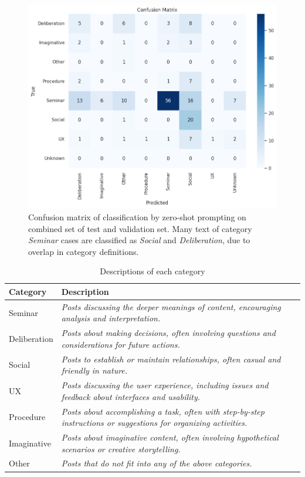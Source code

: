 \documentclass[fleqn,moreauthors,10pt]{ds_report}
\begin{document}
\begin{figure}[ht!]\centering
	\includegraphics[scale=0.4]{fig/zero-shot-combined_cm_2.png}
	\caption{Confusion matrix of classification by zero-shot prompting on combined set of test and validation set.
Many text of category \textit{Seminar} cases are classified as \textit{Social} and \textit{Deliberation}, due to overlap in category definitions.}
	\label{fig:zero_shot_combined_cm}
\end{figure}


\begin{table}[h!]
\caption{Descriptions of each category}
\begin{adjustbox}{width=\columnwidth,center}
\begin{tabular}{l|p{8cm}}
Category & Description\\
\hline
Seminar & \textit{Posts discussing the deeper meanings of content, encouraging analysis and interpretation.} \\
Deliberation & \textit{Posts about making decisions, often involving questions and considerations for future actions.}\\
Social & \textit{Posts to establish or maintain relationships, often casual and friendly in nature.} \\
UX & \textit{Posts discussing the user experience, including issues and feedback about interfaces and usability.} \\
Procedure & \textit{Posts about accomplishing a task, often with step-by-step instructions or suggestions for organizing activities.} \\
Imaginative & \textit{Posts about imaginative content, often involving hypothetical scenarios or creative storytelling.}\\
Other & \textit{Posts that do not fit into any of the above categories.}\\
\end{tabular}
\label{tab:category descriptions}
\end{adjustbox}
\end{table}
\end{document}
